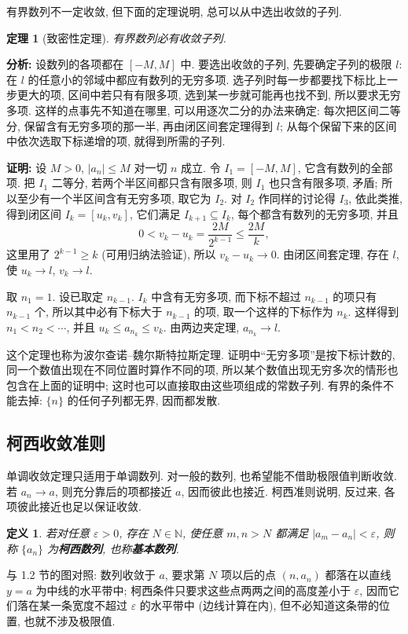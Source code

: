 \documentclass[UTF8,openany]{ctexbook}
\theoremstyle{chinesetextbook}
\newtheorem{definition}{定义}[section]
\newtheorem{theorem}{定理}[section]
\newenvironment{cnproof}{\par\indent\textbf{证明:} \ignorespaces}{\par}
\begin{document}
有界数列不一定收敛, 但下面的定理说明, 总可以从中选出收敛的子列.
\begin{theorem}[致密性定理]
有界数列必有收敛子列.
\end{theorem}
\par\indent\textbf{分析:} 设数列的各项都在 $[-M,M]$ 中. 要选出收敛的子列, 先要确定子列的极限 $l$: 在 $l$ 的任意小的邻域中都应有数列的无穷多项. 选子列时每一步都要找下标比上一步更大的项, 区间中若只有有限多项, 选到某一步就可能再也找不到, 所以要求无穷多项. 这样的点事先不知道在哪里, 可以用逐次二分的办法来确定: 每次把区间二等分, 保留含有无穷多项的那一半, 再由闭区间套定理得到 $l$; 从每个保留下来的区间中依次选取下标递增的项, 就得到所需的子列.
\begin{cnproof}
设 $M>0$, $|a_n|\le M$ 对一切 $n$ 成立. 令 $I_1=[-M,M]$, 它含有数列的全部项. 把 $I_1$ 二等分, 若两个半区间都只含有限多项, 则 $I_1$ 也只含有限多项, 矛盾; 所以至少有一个半区间含有无穷多项, 取它为 $I_2$. 对 $I_2$ 作同样的讨论得 $I_3$, 依此类推, 得到闭区间 $I_k=[u_k,v_k]$, 它们满足 $I_{k+1}\subseteq I_k$, 每个都含有数列的无穷多项, 并且
\[
0<v_k-u_k=\frac{2M}{2^{k-1}}\le\frac{2M}k,
\]
这里用了 $2^{k-1}\ge k$ (可用归纳法验证), 所以 $v_k-u_k\to0$. 由闭区间套定理, 存在 $l$, 使 $u_k\to l$, $v_k\to l$.

取 $n_1=1$. 设已取定 $n_{k-1}$. $I_k$ 中含有无穷多项, 而下标不超过 $n_{k-1}$ 的项只有 $n_{k-1}$ 个, 所以其中必有下标大于 $n_{k-1}$ 的项, 取一个这样的下标作为 $n_k$. 这样得到 $n_1<n_2<\cdots$, 并且 $u_k\le a_{n_k}\le v_k$. 由两边夹定理, $a_{n_k}\to l$.
\end{cnproof}
这个定理也称为波尔查诺--魏尔斯特拉斯定理. 证明中“无穷多项”是按下标计数的, 同一个数值出现在不同位置时算作不同的项, 所以某个数值出现无穷多次的情形也包含在上面的证明中; 这时也可以直接取由这些项组成的常数子列. 有界的条件不能去掉: $\{n\}$ 的任何子列都无界, 因而都发散.
\subsection{柯西收敛准则}
单调收敛定理只适用于单调数列. 对一般的数列, 也希望能不借助极限值判断收敛. 若 $a_n\to a$, 则充分靠后的项都接近 $a$, 因而彼此也接近. 柯西准则说明, 反过来, 各项彼此接近也足以保证收敛.
\begin{definition}
若对任意 $\varepsilon>0$, 存在 $N\in\mathbb N$, 使任意 $m,n>N$ 都满足 $|a_m-a_n|<\varepsilon$, 则称 $\{a_n\}$ 为\textbf{柯西数列}, 也称\textbf{基本数列}.
\end{definition}
与 1.2 节的图对照: 数列收敛于 $a$, 要求第 $N$ 项以后的点 $(n,a_n)$ 都落在以直线 $y=a$ 为中线的水平带中; 柯西条件只要求这些点两两之间的高度差小于 $\varepsilon$, 因而它们落在某一条宽度不超过 $\varepsilon$ 的水平带中 (边线计算在内), 但不必知道这条带的位置, 也就不涉及极限值.
\end{document}

